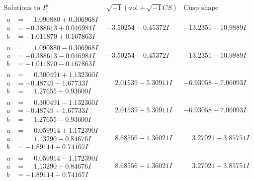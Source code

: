\documentclass[1p]{elsarticle_modified}
\theoremstyle{definition}
\newcommand{\I}{\sqrt{-1}}
\begin{document}
$$\begin{array}{c|c|c}  
\text{Solutions to }I^u_{1}& \I (\text{vol} + \sqrt{-1}CS) & \text{Cusp shape}\\
 \hline 
\begin{aligned}
u &= \phantom{-}1.090880 + 0.306968 I \\
a &= -0.388613 + 0.046984 I \\
b &= -1.011870 + 0.167863 I\end{aligned}
 & -3.50254 + 0.45372 I & -13.2351 - 10.9889 I \\ \hline\begin{aligned}
u &= \phantom{-}1.090880 - 0.306968 I \\
a &= -0.388613 - 0.046984 I \\
b &= -1.011870 - 0.167863 I\end{aligned}
 & -3.50254 - 0.45372 I & -13.2351 + 10.9889 I \\ \hline\begin{aligned}
u &= \phantom{-}0.300491 + 1.132360 I \\
a &= -0.48749 - 1.67733 I \\
b &= \phantom{-}1.27655 + 0.93600 I\end{aligned}
 & \phantom{-}2.01539 - 5.30911 I & -6.93058 + 7.06093 I \\ \hline\begin{aligned}
u &= \phantom{-}0.300491 - 1.132360 I \\
a &= -0.48749 + 1.67733 I \\
b &= \phantom{-}1.27655 - 0.93600 I\end{aligned}
 & \phantom{-}2.01539 + 5.30911 I & -6.93058 - 7.06093 I \\ \hline\begin{aligned}
u &= \phantom{-}0.059914 + 1.172390 I \\
a &= \phantom{-}1.13290 - 0.84676 I \\
b &= -1.89114 + 0.74167 I\end{aligned}
 & \phantom{-}8.68556 - 1.36021 I & \phantom{-}3.27021 + 3.85751 I \\ \hline\begin{aligned}
u &= \phantom{-}0.059914 - 1.172390 I \\
a &= \phantom{-}1.13290 + 0.84676 I \\
b &= -1.89114 - 0.74167 I\end{aligned}
 & \phantom{-}8.68556 + 1.36021 I & \phantom{-}3.27021 - 3.85751 I \\ \hline\begin{aligned}

\end{aligned}
\end{array}$$
\end{document}
